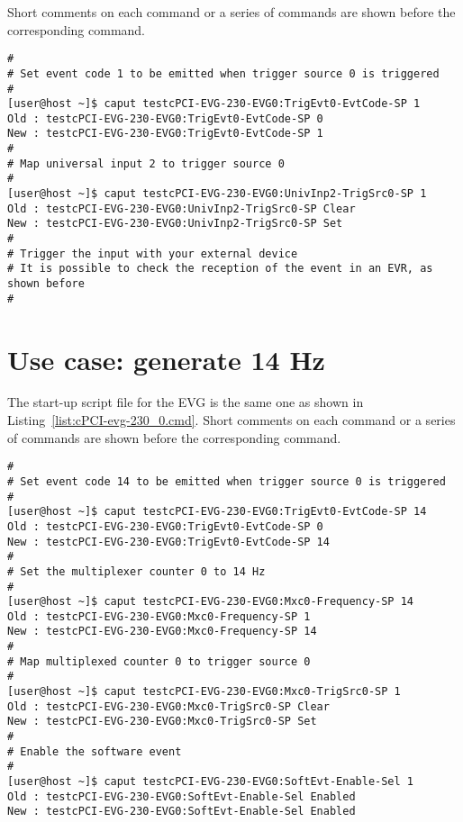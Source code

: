 \documentclass[11pt
  , a4paper
  , article
  , oneside
  , showtrims
]{memoir}
\begin{document}
Short comments on each command or a series of commands are shown before the corresponding command.

\begin{lstlisting}[style=termstyle]
#
# Set event code 1 to be emitted when trigger source 0 is triggered
#
[user@host ~]$ caput testcPCI-EVG-230-EVG0:TrigEvt0-EvtCode-SP 1
Old : testcPCI-EVG-230-EVG0:TrigEvt0-EvtCode-SP 0
New : testcPCI-EVG-230-EVG0:TrigEvt0-EvtCode-SP 1
#
# Map universal input 2 to trigger source 0
#
[user@host ~]$ caput testcPCI-EVG-230-EVG0:UnivInp2-TrigSrc0-SP 1
Old : testcPCI-EVG-230-EVG0:UnivInp2-TrigSrc0-SP Clear
New : testcPCI-EVG-230-EVG0:UnivInp2-TrigSrc0-SP Set
#
# Trigger the input with your external device
# It is possible to check the reception of the event in an EVR, as shown before
#
\end{lstlisting}


\newpage
\chapter{Use case: generate 14 Hz}
The start-up script file for the EVG is the same one as shown in Listing~\ref{list:cPCI-evg-230_0.cmd}. Short comments on each command or a series of commands are shown before the corresponding command.
\begin{lstlisting}[style=termstyle]
#
# Set event code 14 to be emitted when trigger source 0 is triggered
#
[user@host ~]$ caput testcPCI-EVG-230-EVG0:TrigEvt0-EvtCode-SP 14
Old : testcPCI-EVG-230-EVG0:TrigEvt0-EvtCode-SP 0
New : testcPCI-EVG-230-EVG0:TrigEvt0-EvtCode-SP 14
#
# Set the multiplexer counter 0 to 14 Hz
#
[user@host ~]$ caput testcPCI-EVG-230-EVG0:Mxc0-Frequency-SP 14
Old : testcPCI-EVG-230-EVG0:Mxc0-Frequency-SP 1
New : testcPCI-EVG-230-EVG0:Mxc0-Frequency-SP 14
#
# Map multiplexed counter 0 to trigger source 0
#
[user@host ~]$ caput testcPCI-EVG-230-EVG0:Mxc0-TrigSrc0-SP 1
Old : testcPCI-EVG-230-EVG0:Mxc0-TrigSrc0-SP Clear
New : testcPCI-EVG-230-EVG0:Mxc0-TrigSrc0-SP Set
#
# Enable the software event
#
[user@host ~]$ caput testcPCI-EVG-230-EVG0:SoftEvt-Enable-Sel 1
Old : testcPCI-EVG-230-EVG0:SoftEvt-Enable-Sel Enabled
New : testcPCI-EVG-230-EVG0:SoftEvt-Enable-Sel Enabled
\end{lstlisting}
\end{document}
